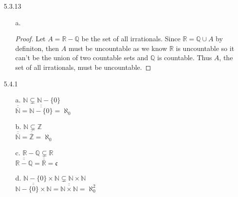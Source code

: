 \documentclass[11pt]{amsart}
\theoremstyle{definition}
\begin{document}
\begin{itemize}
\item[5.3.13]
\begin{itemize}
	\item[a.] \begin{proof}
			Let $A=\mathbb{R}-\mathbb{Q}$ be the set of all irrationals. Since $\mathbb{R}=\mathbb{Q}\cup A$ by definiton, then $A$ must be uncountable as we know $\mathbb{R}$ is uncountable so it can't be the union of two countable sets and $\mathbb{Q}$ is countable. Thus $A$, the set of all irrationals, must be uncountable.
	\end{proof}

\end{itemize}

\item[5.4.1]
\begin{itemize}
	\item[a.] $\mathbb{N}\subsetneq \mathbb{N}-\{0\}$\\
			  $\overline{\overline{\mathbb{N}}}=\overline{\overline{\mathbb{N}-\{0\}}}=\aleph_0$

	\item[b.] $\mathbb{N}\subsetneq\mathbb{Z}$ \\
			  $\overline{\overline{\mathbb{N}}}=\overline{\overline{\mathbb{Z}}}=\aleph_0$

	\item[c.] $\mathbb{R}-\mathbb{Q}\subsetneq\mathbb{R}$ \\
			  $\overline{\overline{\mathbb{R}-\mathbb{Q}}}=\overline{\overline{\mathbb{R}}}=\mathfrak{c}$

	\item[d.] $\mathbb{N}-\{0\}\times\mathbb{N}\subsetneq\mathbb{N}\times\mathbb{N}$ \\
		$\overline{\overline{\mathbb{N}-\{0\}\times\mathbb{N}}}=\overline{\overline{\mathbb{N}\times\mathbb{N}}}=\aleph_0^2$
    
\end{itemize}


\end{itemize}
\end{document}
